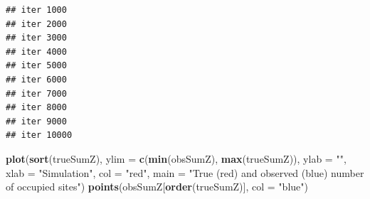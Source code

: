 \documentclass[]{book}
\newenvironment{Shaded}{\begin{snugshade}}{\end{snugshade}}
\newcommand{\KeywordTok}[1]{\textcolor[rgb]{0.13,0.29,0.53}{\textbf{{#1}}}}
\newcommand{\DataTypeTok}[1]{\textcolor[rgb]{0.13,0.29,0.53}{{#1}}}
\newcommand{\DecValTok}[1]{\textcolor[rgb]{0.00,0.00,0.81}{{#1}}}
\newcommand{\CharTok}[1]{\textcolor[rgb]{0.31,0.60,0.02}{{#1}}}
\newcommand{\StringTok}[1]{\textcolor[rgb]{0.31,0.60,0.02}{{#1}}}
\newcommand{\CommentTok}[1]{\textcolor[rgb]{0.56,0.35,0.01}{\textit{{#1}}}}
\newcommand{\OtherTok}[1]{\textcolor[rgb]{0.56,0.35,0.01}{{#1}}}
\newcommand{\NormalTok}[1]{{#1}}
\begin{document}
\begin{Shaded}
\end{Shaded}

\begin{verbatim}
## iter 1000 
## iter 2000 
## iter 3000 
## iter 4000 
## iter 5000 
## iter 6000 
## iter 7000 
## iter 8000 
## iter 9000 
## iter 10000
\end{verbatim}

\begin{Shaded}
\begin{Highlighting}[]
\KeywordTok{plot}\NormalTok{(}\KeywordTok{sort}\NormalTok{(trueSumZ), }\DataTypeTok{ylim =} \KeywordTok{c}\NormalTok{(}\KeywordTok{min}\NormalTok{(obsSumZ), }\KeywordTok{max}\NormalTok{(trueSumZ)), }\DataTypeTok{ylab =} \StringTok{""}\NormalTok{, }\DataTypeTok{xlab =} \StringTok{"Simulation"}\NormalTok{,}
     \DataTypeTok{col =} \StringTok{"red"}\NormalTok{, }\DataTypeTok{main =} \StringTok{"True (red) and observed (blue) number of occupied sites"}\NormalTok{)}
\KeywordTok{points}\NormalTok{(obsSumZ[}\KeywordTok{order}\NormalTok{(trueSumZ)], }\DataTypeTok{col =} \StringTok{"blue"}\NormalTok{)}
\end{Highlighting}
\end{Shaded}
\end{document}
